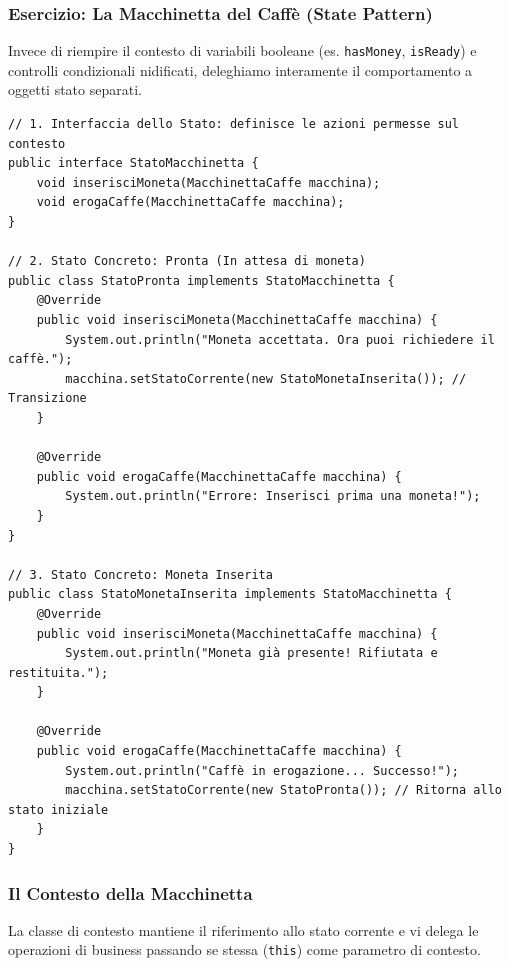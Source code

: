 \documentclass[12pt, a4paper]{article}
\begin{document}
\newpage

\subsubsection{Esercizio: La Macchinetta del Caffè (State Pattern)}
Invece di riempire il contesto di variabili booleane (es. \texttt{hasMoney}, \texttt{isReady}) e controlli condizionali nidificati, deleghiamo interamente il comportamento a oggetti stato separati.


\begin{verbatim}
// 1. Interfaccia dello Stato: definisce le azioni permesse sul contesto
public interface StatoMacchinetta {
    void inserisciMoneta(MacchinettaCaffe macchina);
    void erogaCaffe(MacchinettaCaffe macchina);
}

// 2. Stato Concreto: Pronta (In attesa di moneta)
public class StatoPronta implements StatoMacchinetta {
    @Override
    public void inserisciMoneta(MacchinettaCaffe macchina) {
        System.out.println("Moneta accettata. Ora puoi richiedere il caffè.");
        macchina.setStatoCorrente(new StatoMonetaInserita()); // Transizione
    }

    @Override
    public void erogaCaffe(MacchinettaCaffe macchina) {
        System.out.println("Errore: Inserisci prima una moneta!");
    }
}

// 3. Stato Concreto: Moneta Inserita
public class StatoMonetaInserita implements StatoMacchinetta {
    @Override
    public void inserisciMoneta(MacchinettaCaffe macchina) {
        System.out.println("Moneta già presente! Rifiutata e restituita.");
    }

    @Override
    public void erogaCaffe(MacchinettaCaffe macchina) {
        System.out.println("Caffè in erogazione... Successo!");
        macchina.setStatoCorrente(new StatoPronta()); // Ritorna allo stato iniziale
    }
}
\end{verbatim}

\newpage

\subsubsection{Il Contesto della Macchinetta}
La classe di contesto mantiene il riferimento allo stato corrente e vi delega le operazioni di business passando se stessa (\texttt{this}) come parametro di contesto.
\end{document}
